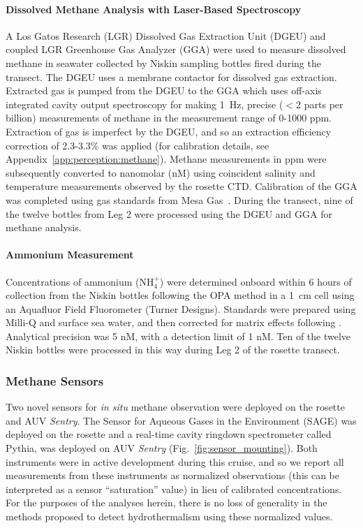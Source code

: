 \paragraph{Dissolved Methane Analysis with Laser-Based Spectroscopy}
A Los Gatos Research (LGR) Dissolved Gas Extraction Unit (DGEU) and coupled LGR Greenhouse Gas Analyzer (GGA) were used to measure dissolved methane in seawater collected by Niskin sampling bottles fired during the transect. The DGEU uses a membrane contactor for dissolved gas extraction. Extracted gas is pumped from the DGEU to the GGA which uses off-axis integrated cavity output spectroscopy for making \SI{1}{\hertz}, precise ($<$2 parts per billion) measurements of methane in the measurement range of 0-1000 ppm. Extraction of gas is imperfect by the DGEU, and so an extraction efficiency correction of 2.3-3.3\% was applied (for calibration details, see Appendix~\ref{app:perception:methane}). Methane measurements in ppm were subsequently converted to nanomolar (nM) using coincident salinity and temperature measurements observed by the rosette CTD. Calibration of the GGA was completed using gas standards from Mesa Gas~\autocite{michel2021observations}. During the transect, nine of the twelve bottles from Leg 2 were processed using the DGEU and GGA for methane analysis.

\paragraph{Ammonium Measurement}
Concentrations of ammonium (NH$_4^+$) were determined onboard within 6 hours of collection from the Niskin bottles following the OPA method\autocite{holmes1999simple} in a \SI{1}{\centi\meter} cell using an Aquafluor Field Fluorometer (Turner Designs). Standards were prepared using Milli-Q and surface sea water, and then corrected for matrix effects following \cite{taylor2007improving}. Analytical precision was 5 nM, with a detection limit of 1 nM. Ten of the twelve Niskin bottles were processed in this way during Leg 2 of the rosette transect.

\subsubsection{Methane Sensors}
Two novel sensors for \emph{in situ} methane observation were deployed on the rosette and AUV \emph{Sentry}. The Sensor for Aqueous Gases in the Environment (SAGE) was deployed on the rosette and a real-time cavity ringdown spectrometer called Pythia, was deployed on AUV \emph{Sentry} (Fig.~\ref{fig:sensor_mounting}). Both instruments were in active development during this cruise, and so we report all measurements from these instruments as normalized observations (this can be interpreted as a sensor ``saturation'' value) in lieu of calibrated concentrations. For the purposes of the analyses herein, there is no loss of generality in the methods proposed to detect hydrothermalism using these normalized values.

